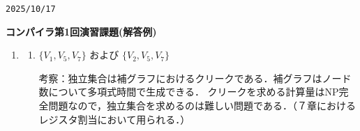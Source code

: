 \documentclass[dvipdfmx]{jarticle}
\begin{document}
\begin{flushright}
  \verb|2025/10/17|
\end{flushright}
\begin{center}
  {\bf\Large コンパイラ第1回演習課題(解答例)}
\end{center}

\vspace*{2cm}

\begin{enumerate}
  \item
        \begin{enumerate}
          \item $\{V_1,V_5,V_7\}$ および $\{V_2,V_5,V_7\}$

                考察：独立集合は補グラフにおけるクリークである．補グラフはノード数について多項式時間で生成できる．
                クリークを求める計算量はNP完全問題なので，独立集合を求めるのは難しい問題である．（７章における
                レジスタ割当において用られる．）


\end{enumerate}
\end{enumerate}
\end{document}
